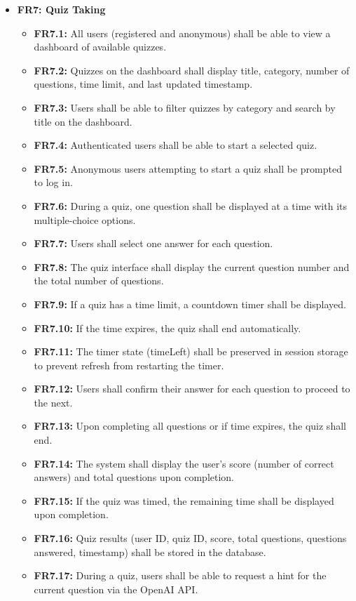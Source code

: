 \begin{itemize}
    \item \textbf{FR7: Quiz Taking}
    \begin{itemize}
        \item \textbf{FR7.1:} All users (registered and anonymous) shall be able to view a dashboard of available quizzes.
        \item \textbf{FR7.2:} Quizzes on the dashboard shall display title, category, number of questions, time limit, and last updated timestamp.
        \item \textbf{FR7.3:} Users shall be able to filter quizzes by category and search by title on the dashboard.
        \item \textbf{FR7.4:} Authenticated users shall be able to start a selected quiz.
        \item \textbf{FR7.5:} Anonymous users attempting to start a quiz shall be prompted to log in.
        \item \textbf{FR7.6:} During a quiz, one question shall be displayed at a time with its multiple-choice options.
        \item \textbf{FR7.7:} Users shall select one answer for each question.
        \item \textbf{FR7.8:} The quiz interface shall display the current question number and the total number of questions.
        \item \textbf{FR7.9:} If a quiz has a time limit, a countdown timer shall be displayed.
        \item \textbf{FR7.10:} If the time expires, the quiz shall end automatically.
        \item \textbf{FR7.11:} The timer state (timeLeft) shall be preserved in session storage to prevent refresh from restarting the timer.
        \item \textbf{FR7.12:} Users shall confirm their answer for each question to proceed to the next.
        \item \textbf{FR7.13:} Upon completing all questions or if time expires, the quiz shall end.
        \item \textbf{FR7.14:} The system shall display the user's score (number of correct answers) and total questions upon completion.
        \item \textbf{FR7.15:} If the quiz was timed, the remaining time shall be displayed upon completion.
        \item \textbf{FR7.16:} Quiz results (user ID, quiz ID, score, total questions, questions answered, timestamp) shall be stored in the database.
        \item \textbf{FR7.17:} During a quiz, users shall be able to request a hint for the current question via the OpenAI API.
    \end{itemize}


\end{itemize}
